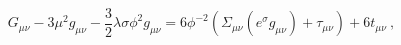 \begin{equation}
G_{\mu \nu}-3\mu^2 g_{\mu\nu}-\frac{3}{2}\lambda \sigma \phi^2
g_{\mu\nu} =6\phi^{-2}(\Sigma_{\mu \nu}(e^{\sigma}g_{\mu
\nu})+\tau_{\mu\nu})+ 6t_{\mu\nu}~, \label{5-a}\end{equation}

